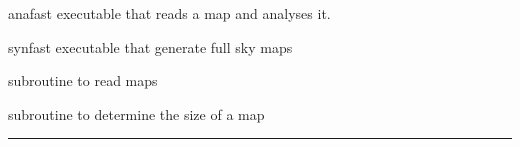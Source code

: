 

\begin{related}
  \begin{sulist}{} %
  \item[anafast] executable that reads a \healpix map and analyses it. 
  \item[synfast] executable that generate full sky \healpix maps
  \item[\htmlref{read\_healpix\_map}{csub:read_healpix_map}] subroutine to read \healpix maps
  \item[\htmlref{get\_fits\_size}{csub:get_fits_size}] subroutine to determine the size of a map
  \end{sulist}
\end{related}

\rule{\hsize}{2mm}

\newpage
